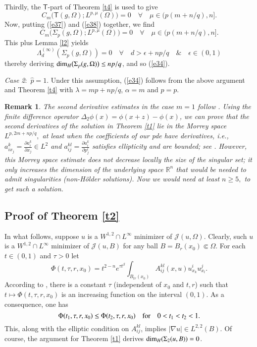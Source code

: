 \documentclass[12pt]{amsart}
\newtheorem{remark}[theorem]{Remark}
\begin{document}
Thirdly, the $\mathsf{T}$-part of Theorem \ref{t4} is used to give
\begin{equation}\label{e38}
  C_m\big(\mathsf{T}(g,\Omega); L^{p,\mu}(\Omega)\big)=0\quad{\forall}\quad \mu\in (p(m+n/q),n].
  \end{equation}
Now, putting (\ref{e37}) and (\ref{e38}) together, we find
\begin{equation*}
  C_m\big(\Sigma_p(g,\Omega); L^{p,\mu}(\Omega)\big)=0\quad{\forall}\quad \mu\in (p(m+n/q),n].
  \end{equation*}
This plus Lemma \ref{l2} yields
$$
\Lambda_d^{(\infty)}(\Sigma_p(g,\Omega))=0\quad\forall\quad d>\epsilon+{np}/{q}\quad\&\quad\epsilon\in (0,1)
$$
thereby deriving $\hbox{dim}_H\big(\Sigma_p(g,\Omega)\big)\le np/q$, and so (\ref{e34}).

{\it Case 2}:\ $\hat{p}=1$. Under this assumption, (\ref{e34}) follows from the above argument and Theorem \ref{t4} with $\lambda=mp+np/q$, $\alpha=m$ and $p=p$.

\begin{remark} The second derivative estimates in the case $m=1$ follow \cite[Theorem 8.15]{BF2002}. Using the finite difference operator $\Delta_2 \phi(x)=\phi(x + z)-\phi(x)$, we
can prove that the second derivatives of the solution in Theorem \ref{t1} lie in the Morrey space $L^{p, 2m + np/q},$ at least when the
coefficients of our pde have derivatives, i.e., $a_{i x_j}^{k} =
\frac{\partial a_{i}^{k}}{\partial x_j} \in L^{2} $ and $
  a_{ij}^{kl} = \frac{\partial a_{i}^{k}}{\partial p_{j}^{l}}
  $ satisfies ellipticity and are bounded; see \cite{BF2002}. However, this Morrey space estimate does not decrease locally the size of the singular set; it only increases the dimension of the
underlying space $\mathbb R^{n}$ that would be needed to admit
singularities (non-H\"older solutions). Now we would need at least
$n\geq 5,$ to get such a solution.
\end{remark}

\subsection{Proof of Theorem \ref{t2}} In what follows, suppose $u$ is a $W^{1,2}\cap L^\infty$ minimizer of $\mathcal{J}(u,\Omega)$. Clearly, such $u$ is a $W^{1,2}\cap L^\infty$ minimizer of $\mathcal{J}(u,B)$ for any ball $B=B_r(x_0)\Subset\Omega$. For each $t\in (0,1)$ and $\tau>0$ let
$$
\Phi(t,\tau,r,x_0)=t^{2-n}e^{\tau t^\beta}\int_{B_{tr}(x_0)}A^{kl}_{ij}(x,u)u_{x_k}^iu_{x_l}^j.
$$
According to \cite{GG1984}, there is a constant $\tau$ (independent of $x_0$ and $t,r$) such that $t\mapsto\Phi(t,\tau,r,x_0)$ is an increasing function on the interval $(0,1)$. As a consequence, one has
$$
\Phi(t_1,\tau,r,x_0)\le \Phi(t_2,\tau,r,x_0)\quad\hbox{for}\quad 0<t_1<t_2<1.
$$
This, along with the elliptic condition on $A^{kl}_{ij}$, implies $|\nabla u|\in L^{2,2}(B)$. Of course, the argument for Theorem \ref{t1} derives $\hbox{dim}_H(\Sigma_2(u,B))=0$.
\end{document}
